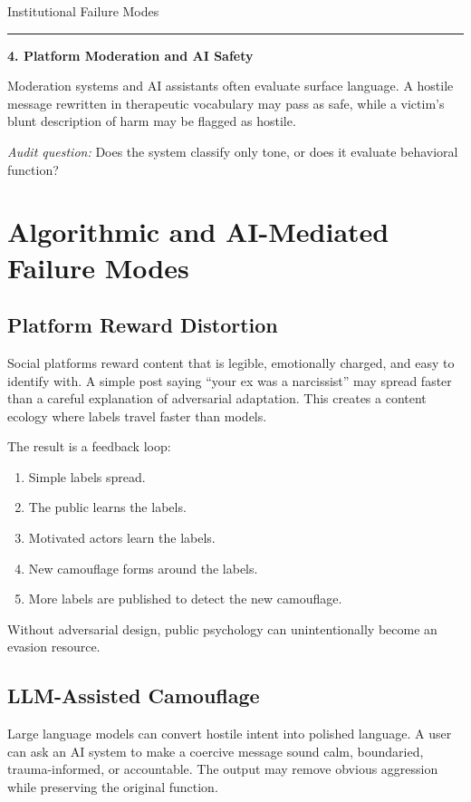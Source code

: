 \documentclass[11pt, letterpaper]{article}
\newcommand{\term}[1]{\textbf{#1}}
\begin{document}
\begin{frameworkbox}{Institutional Failure Modes}
\vspace{0.5em}\hrule\vspace{0.7em}

\term{4. Platform Moderation and AI Safety}

Moderation systems and AI assistants often evaluate surface language. A hostile message rewritten in therapeutic vocabulary may pass as safe, while a victim's blunt description of harm may be flagged as hostile.

\textit{Audit question:} Does the system classify only tone, or does it evaluate behavioral function?
\end{frameworkbox}

\section{Algorithmic and AI-Mediated Failure Modes}

\subsection{Platform Reward Distortion}

Social platforms reward content that is legible, emotionally charged, and easy to identify with. A simple post saying ``your ex was a narcissist'' may spread faster than a careful explanation of adversarial adaptation. This creates a content ecology where labels travel faster than models.

The result is a feedback loop:

\begin{enumerate}
    \item Simple labels spread.
    \item The public learns the labels.
    \item Motivated actors learn the labels.
    \item New camouflage forms around the labels.
    \item More labels are published to detect the new camouflage.
\end{enumerate}

Without adversarial design, public psychology can unintentionally become an evasion resource.

\subsection{LLM-Assisted Camouflage}

Large language models can convert hostile intent into polished language. A user can ask an AI system to make a coercive message sound calm, boundaried, trauma-informed, or accountable. The output may remove obvious aggression while preserving the original function.
\end{document}
